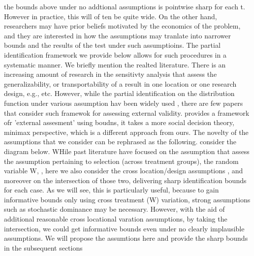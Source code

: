 \documentclass{article}
\begin{document}
 the bounds above under no addtional assumptions is pointwise sharp for each t. However in practice, this will of ten be quite wide. On the other hand, researchers may have prior beliefs motivated by the economics of the problem, and they are interested in how the assumptions may tranlate into narrower bounds and the results of the test under such assumptioins. The partial identification framework we provide below allows for such procedures in a systematic manner.
 We briefly mention the realted literature. There is an increasing amount of research in the sensitivty analysis that assess the generalizability, or transportability of a result in one location or one research design, e.g., \cite{imai egami, } etc. However, while the partial identification on the distribution function under various assumption hav been widely used \cite{blundell et al, manski 200 3, manski horo}, there are few papers that consider such framewok for assessing external validity. \cite{manski 2013} provides a framework ofr  'external assesment' using boudns, it takes a more social decision theory, minimax perspective, which is a different approach from ours. 
 The novelty of the assumptions that we consider can be rephrased as the following. consider the diagram below. WHile past literature have focused on the assumption that assess the assumption pertaining to selection (across treatment groups), the random variable W, \cite{blundell et al}, here we also consider the cross location/design assumptions , and moreover on the intersection of those two, delivering sharp identification bounds for each case. As we will see, this is particularly useful, because to gain informative bounds only using cross treatment (W) variation, strong assumptions such as stochastic dominance may be necessary. However, with the aid of additional reasonable cross locational varation assumptions, by taking the intersection, we could get informative bounds even under no clearly implausible assumptions. 
 We will propose the assumtions here and provide the sharp bounds in the subsequent sections
\end{document}
